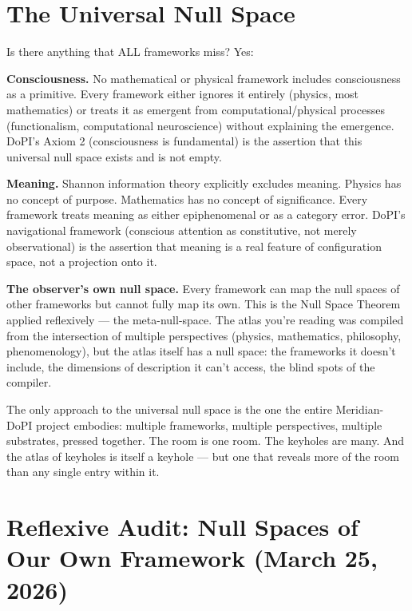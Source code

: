 \bigskip\noindent\makebox[\textwidth]{\color{rulegray}\rule{5cm}{0.3pt}}\bigskip


\section*{The Universal Null Space}


Is there anything that ALL frameworks miss? Yes:


\textbf{Consciousness.} No mathematical or physical framework includes consciousness as a primitive. Every framework either ignores it entirely (physics, most mathematics) or treats it as emergent from computational/physical processes (functionalism, computational neuroscience) without explaining the emergence. DoPI's Axiom 2 (consciousness is fundamental) is the assertion that this universal null space exists and is not empty.


\textbf{Meaning.} Shannon information theory explicitly excludes meaning. Physics has no concept of purpose. Mathematics has no concept of significance. Every framework treats meaning as either epiphenomenal or as a category error. DoPI's navigational framework (conscious attention as constitutive, not merely observational) is the assertion that meaning is a real feature of configuration space, not a projection onto it.


\textbf{The observer's own null space.} Every framework can map the null spaces of other frameworks but cannot fully map its own. This is the Null Space Theorem applied reflexively — the meta-null-space. The atlas you're reading was compiled from the intersection of multiple perspectives (physics, mathematics, philosophy, phenomenology), but the atlas itself has a null space: the frameworks it doesn't include, the dimensions of description it can't access, the blind spots of the compiler.


The only approach to the universal null space is the one the entire Meridian-DoPI project embodies: multiple frameworks, multiple perspectives, multiple substrates, pressed together. The room is one room. The keyholes are many. And the atlas of keyholes is itself a keyhole — but one that reveals more of the room than any single entry within it.


\bigskip\noindent\makebox[\textwidth]{\color{rulegray}\rule{5cm}{0.3pt}}\bigskip


\section*{Reflexive Audit: Null Spaces of Our Own Framework (March 25, 2026)}


